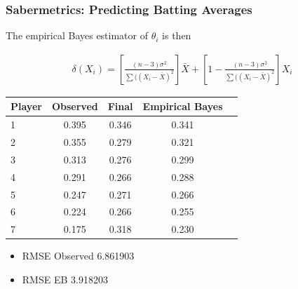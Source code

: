 \documentclass[
  shownotes,
  xcolor={svgnames},
  hyperref={colorlinks,citecolor=DarkBlue,linkcolor=DarkRed,urlcolor=DarkBlue}
  ]{beamer}
\begin{document}
\begin{frame}[fragile]
\frametitle{Sabermetrics: Predicting Batting Averages}

The empirical Bayes estimator of $\theta_i$ is then
\begin{footnotesize}
  \begin{align}
    \delta(X_i)= \left[ \frac{(n-3)\sigma^2}{\sum((X_i-\bar X)^2}\right] \bar X + \left[ 1- \frac{(n-3)\sigma^2}{\sum((X_i-\bar X)^2}\right] X_i
  \end{align}
\end{footnotesize}


\begin{table}[]
\begin{tabular}{lcccc}
\hline
\hline
Player & Observed & Final & Empirical Bayes  \\
\hline
1      & 0.395    & 0.346 & 0.341            \\
2      & 0.355    & 0.279 & 0.321            \\
3      & 0.313    & 0.276 & 0.299            \\
4      & 0.291    & 0.266 & 0.288            \\
5      & 0.247    & 0.271 & 0.266            \\
6      & 0.224    & 0.266 & 0.255            \\
7      & 0.175    & 0.318 & 0.230           \\
\hline
\hline
\end{tabular}
\end{table}

\begin{itemize}
\item RMSE Observed 6.861903
\item RMSE EB 3.918203
\end{itemize}
\end{frame}
\end{document}
